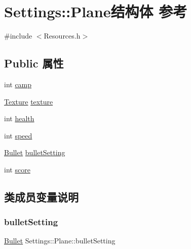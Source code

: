 \hypertarget{struct_settings_1_1_plane}{}\section{Settings\+:\+:Plane结构体 参考}
\label{struct_settings_1_1_plane}


{\ttfamily \#include $<$Resources.\+h$>$}

\subsection*{Public 属性}
\begin{DoxyCompactItemize}
\item 
int \hyperlink{struct_settings_1_1_plane_a62d563a2ebc841e01bfe4737bf1fe0ab}{camp}
\item 
\hyperlink{struct_texture}{Texture} \hyperlink{struct_settings_1_1_plane_a6a000124604eb5435f4d77bbec170a4f}{texture}
\item 
int \hyperlink{struct_settings_1_1_plane_a71ffa9166855277d353d0fb6ac8f58f6}{health}
\item 
int \hyperlink{struct_settings_1_1_plane_a814ee5fe2c6b873ff4f0e0208f2c240a}{speed}
\item 
\hyperlink{struct_settings_1_1_bullet}{Bullet} \hyperlink{struct_settings_1_1_plane_a8416c74c0910b4c7a9da8d633e0c346a}{bullet\+Setting}
\item 
int \hyperlink{struct_settings_1_1_plane_a20a8861d723406f4d49610804226dd82}{score}
\end{DoxyCompactItemize}


\subsection{类成员变量说明}
\mbox{\label{struct_settings_1_1_plane_a8416c74c0910b4c7a9da8d633e0c346a}} 
\subsubsection{\texorpdfstring{bullet\+Setting}{bulletSetting}}
{\footnotesize\ttfamily \hyperlink{struct_settings_1_1_bullet}{Bullet} Settings\+::\+Plane\+::bullet\+Setting}

\mbox{\label{struct_settings_1_1_plane_a62d563a2ebc841e01bfe4737bf1fe0ab}} 
